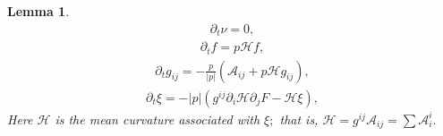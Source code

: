 \documentclass{amsart}
\newtheorem{lemma}[theorem]{Lemma}
\theoremstyle{definition}
\theoremstyle{remark}
\numberwithin{equation}{section}
\begin{document}
\begin{lemma}
\begin{align}
\partial_t\nu=0,
\end{align}
\begin{align}
\partial_t f = p  \mathcal{H} f ,
\end{align}
\begin{align}
\partial_tg_{ij}=-\frac{p}{|p|}(\mathcal{A}_{ij}+p  \mathcal{H}g_{ij}),
\end{align}
\begin{align}
\partial_t\xi=- |p|(g^{ij}\partial_i\mathcal{H}\partial_jF- \mathcal{H}\xi),
\end{align}
Here $\mathcal{H}$ is the mean curvature associated with $\xi;$ that is, $\mathcal{H}=g^{ij}\mathcal{A}_{ij}=\sum \mathcal{A}_i^i.$
\end{lemma}
\end{document}
